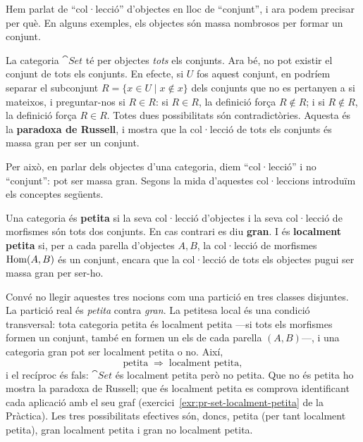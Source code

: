 Hem parlat de \enquote{col·lecció} d'objectes en lloc de \enquote{conjunt}, i ara podem precisar per què. En alguns exemples, els objectes són massa nombrosos per formar un conjunt.

\begin{observacio}
La categoria $\cat{Set}$ té per objectes \emph{tots} els conjunts. Ara bé, no pot existir el conjunt de tots els conjunts. En efecte, si $U$ fos aquest conjunt, en podríem separar el subconjunt $R=\{x\in U\mid x\notin x\}$ dels conjunts que no es pertanyen a si mateixos, i preguntar-nos si $R\in R$: si $R\in R$, la definició força $R\notin R$; i si $R\notin R$, la definició força $R\in R$. Totes dues possibilitats són contradictòries. Aquesta és la \textbf{paradoxa de Russell}, i mostra que la col·lecció de tots els conjunts és massa gran per ser un conjunt.
\end{observacio}

Per això, en parlar dels objectes d'una categoria, diem \enquote{col·lecció} i no \enquote{conjunt}: pot ser massa gran. Segons la mida d'aquestes col·leccions introduïm els conceptes següents.

\begin{definicio}
Una categoria és \textbf{petita} si la seva col·lecció d'objectes i la seva col·lecció de morfismes són tots dos conjunts. En cas contrari es diu \textbf{gran}. I és \textbf{localment petita} si, per a cada parella d'objectes $A,B$, la col·lecció de morfismes $\operatorname{Hom}(A,B)$ és un conjunt, encara que la col·lecció de tots els objectes pugui ser massa gran per ser-ho.
\end{definicio}

Convé no llegir aquestes tres nocions com una partició en tres classes disjuntes. La partició real és \emph{petita} contra \emph{gran}. La petitesa local és una condició transversal: tota categoria petita és localment petita ---si tots els morfismes formen un conjunt, també en formen un els de cada parella $(A,B)$---, i una categoria gran pot ser localment petita o no. Així,
\[
\text{petita}\;\Longrightarrow\;\text{localment petita},
\]
i el recíproc és fals: $\cat{Set}$ és localment petita però no petita. Que no és petita ho mostra la paradoxa de Russell; que és localment petita es comprova identificant cada aplicació amb el seu graf (exercici~\ref{exr:pr-set-localment-petita} de la Pràctica). Les tres possibilitats efectives són, doncs, petita (per tant localment petita), gran localment petita i gran no localment petita.

